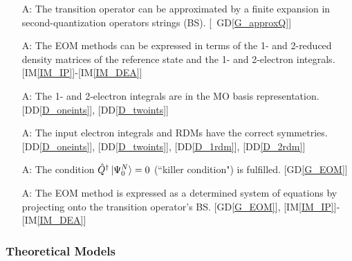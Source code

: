 \documentclass[12pt]{article}
\newcommand{\dref}[1]{GD\ref{#1}}
\newcommand{\ddref}[1]{DD\ref{#1}}
\newcounter{assumpnum} %
\newcommand{\iref}[1]{IM\ref{#1}}
\begin{document}
\begin{itemize}

\item[A\refstepcounter{assumpnum}\theassumpnum \label{A_transition_op_approx}:] 
The 
transition operator can be approximated by a finite expansion in 
second-quantization operators strings (BS). [~\dref{G_approxQ}]
\item[A\refstepcounter{assumpnum}\theassumpnum \label{A_dms_mointeg}:] The EOM 
methods can be expressed in terms of the 1- and 2-reduced density
matrices of the reference state and the 1- and 2-electron integrals.
[\iref{IM_IP}]-[\iref{IM_DEA}]
\item[A\refstepcounter{assumpnum}\theassumpnum \label{A_int_mos}:] The 1- and 
2-electron integrals are in the MO basis representation. [\ddref{D_oneints}], 
[\ddref{D_twoints}]
\item[A\refstepcounter{assumpnum}\theassumpnum \label{A_symmetry}:] The input 
electron integrals and RDMs have the correct symmetries.[\ddref{D_oneints}], 
[\ddref{D_twoints}], [\ddref{D_1rdm}], 
[\ddref{D_2rdm}]
\item[A\refstepcounter{assumpnum}\theassumpnum \label{A_killercond}:] The 
condition $\hat{Q}^{\dagger}\ket{\Psi^{N}_0} = 0$ (``killer condition") is 
fulfilled. [\dref{G_EOM}]
\item[A\refstepcounter{assumpnum}\theassumpnum \label{A_sproj}:] The EOM method 
is expressed as a determined system of equations by projecting onto the 
transition operator's BS. [\dref{G_EOM}], [\iref{IM_IP}]-[\iref{IM_DEA}]

\end{itemize}

\subsubsection{Theoretical Models}\label{sec_theoretical}

\end{document}
